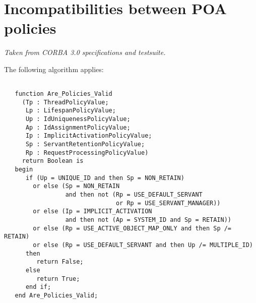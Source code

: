 \documentclass[a4paper,10pt]{article}
\begin{document}
\section{Incompatibilities between POA policies}

{\it Taken from CORBA 3.0 specifications and testsuite.}

The following algorithm applies:

\begin{verbatim}

   function Are_Policies_Valid
     (Tp : ThreadPolicyValue;
      Lp : LifespanPolicyValue;
      Up : IdUniquenessPolicyValue;
      Ap : IdAssignmentPolicyValue;
      Ip : ImplicitActivationPolicyValue;
      Sp : ServantRetentionPolicyValue;
      Rp : RequestProcessingPolicyValue)
     return Boolean is
   begin
      if (Up = UNIQUE_ID and then Sp = NON_RETAIN)
        or else (Sp = NON_RETAIN
                 and then not (Rp = USE_DEFAULT_SERVANT
                               or Rp = USE_SERVANT_MANAGER))
        or else (Ip = IMPLICIT_ACTIVATION
                 and then not (Ap = SYSTEM_ID and Sp = RETAIN))
        or else (Rp = USE_ACTIVE_OBJECT_MAP_ONLY and then Sp /= RETAIN)
        or else (Rp = USE_DEFAULT_SERVANT and then Up /= MULTIPLE_ID)
      then
         return False;
      else
         return True;
      end if;
   end Are_Policies_Valid;

\end{verbatim}
\end{document}
